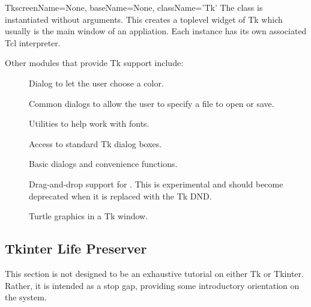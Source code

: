 \begin{classdesc}{Tk}{screenName=None, baseName=None, className='Tk'}
The  class is instantiated without arguments.
This creates a toplevel widget of Tk which usually is the main window
of an appliation. Each instance has its own associated Tcl interpreter.
\end{classdesc}

Other modules that provide Tk support include:

\begin{description}

\item[]
Dialog to let the user choose a color.

\item[]

\item[]
Common dialogs to allow the user to specify a file to open or save.

\item[]
Utilities to help work with fonts.

\item[]
Access to standard Tk dialog boxes.

\item[]
Basic dialogs and convenience functions.

\item[]
Drag-and-drop support for .
This is experimental and should become deprecated when it is replaced 
with the Tk DND.

\item[]
Turtle graphics in a Tk window.

\end{description}

\subsection{Tkinter Life Preserver}

This section is not designed to be an exhaustive tutorial on either
Tk or Tkinter.  Rather, it is intended as a stop gap, providing some
introductory orientation on the system.

